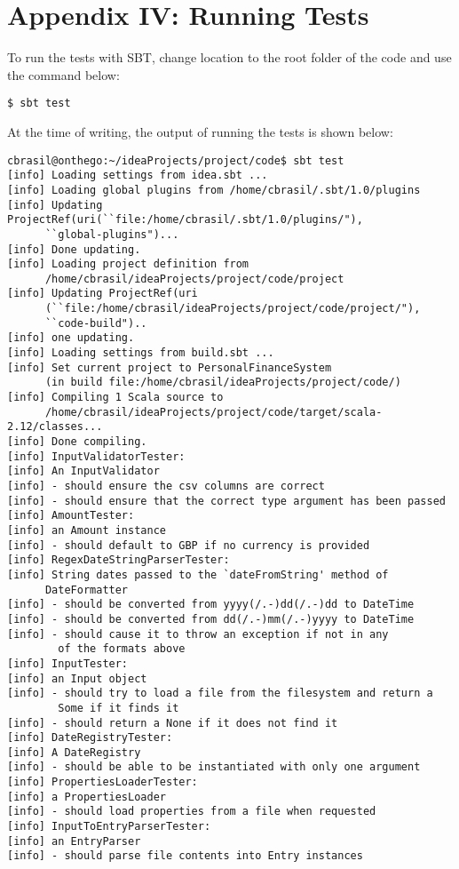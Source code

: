 \section{Appendix IV: Running Tests} \label{appendix4}

To run the tests with SBT, change location to the root folder of the code and
use the command below:
\begin{lstlisting}
$ sbt test
\end{lstlisting}

At the time of writing, the output of running the tests is shown below:
\begin{lstlisting}
cbrasil@onthego:~/ideaProjects/project/code$ sbt test
[info] Loading settings from idea.sbt ...
[info] Loading global plugins from /home/cbrasil/.sbt/1.0/plugins
[info] Updating ProjectRef(uri(``file:/home/cbrasil/.sbt/1.0/plugins/"),
      ``global-plugins")...
[info] Done updating.
[info] Loading project definition from 
      /home/cbrasil/ideaProjects/project/code/project
[info] Updating ProjectRef(uri
      (``file:/home/cbrasil/ideaProjects/project/code/project/"),
      ``code-build")..
[info] one updating.
[info] Loading settings from build.sbt ...
[info] Set current project to PersonalFinanceSystem 
      (in build file:/home/cbrasil/ideaProjects/project/code/)
[info] Compiling 1 Scala source to 
      /home/cbrasil/ideaProjects/project/code/target/scala-2.12/classes...
[info] Done compiling.
[info] InputValidatorTester:
[info] An InputValidator
[info] - should ensure the csv columns are correct
[info] - should ensure that the correct type argument has been passed
[info] AmountTester:
[info] an Amount instance
[info] - should default to GBP if no currency is provided
[info] RegexDateStringParserTester:
[info] String dates passed to the `dateFromString' method of
      DateFormatter
[info] - should be converted from yyyy(/.-)dd(/.-)dd to DateTime
[info] - should be converted from dd(/.-)mm(/.-)yyyy to DateTime
[info] - should cause it to throw an exception if not in any
        of the formats above
[info] InputTester:
[info] an Input object
[info] - should try to load a file from the filesystem and return a 
        Some if it finds it
[info] - should return a None if it does not find it
[info] DateRegistryTester:
[info] A DateRegistry
[info] - should be able to be instantiated with only one argument
[info] PropertiesLoaderTester:
[info] a PropertiesLoader
[info] - should load properties from a file when requested
[info] InputToEntryParserTester:
[info] an EntryParser
[info] - should parse file contents into Entry instances

\end{lstlisting}
